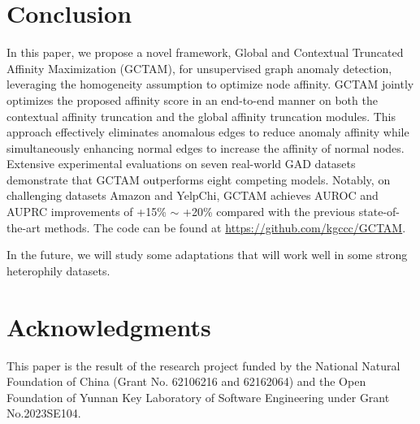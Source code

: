 \documentclass{article}
\begin{document}
\section{Conclusion}
In this paper, we propose a novel framework, Global and Contextual Truncated Affinity Maximization (GCTAM), for unsupervised graph anomaly detection, leveraging the homogeneity assumption to optimize node affinity. GCTAM jointly optimizes the proposed affinity score in an end-to-end manner on both the contextual affinity truncation and the global affinity truncation modules. This approach effectively eliminates anomalous edges to reduce anomaly affinity while simultaneously enhancing normal edges to increase the affinity of normal nodes. Extensive experimental evaluations on seven real-world GAD datasets demonstrate that GCTAM outperforms eight competing models. Notably, on challenging datasets Amazon and YelpChi, GCTAM achieves AUROC and AUPRC improvements of +15\% $\sim$ +20\% compared with the previous state-of-the-art methods. The code can be found at \url{https://github.com/kgccc/GCTAM}.

In the future, we will study some adaptations that will work well in some strong heterophily datasets. 






\label{sec:Acknowledgments}
\section*{Acknowledgments}
This paper is the result of the research project funded by the National Natural Foundation of China (Grant No. 62106216 and 62162064) and the Open Foundation of Yunnan Key Laboratory of Software Engineering under Grant No.2023SE104.
\end{document}
